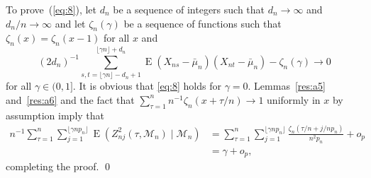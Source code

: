 \documentclass[12pt]{article}
\theoremstyle{definition}
\DeclareMathOperator{\E}{E}
\begin{document}
To prove~(\ref{eq:8}), let $d_n$ be a sequence of integers such that
$d_n \to \infty$ and $d_n/n \to \infty$ and let $\zeta_n(\gamma)$ be a
sequence of functions such that $\zeta_n(x) = \zeta_n(x - 1)$ for all
$x$ and
\begin{equation}
  (2 d_n)^{-1} \sum_{s,t = \lfloor \gamma n \rfloor - d_n +
    1}^{\lfloor \gamma n \rfloor + d_n} \E (X_{ns} -
  \bar{\mu}_n)(X_{nt} - \bar{\mu}_n) - \zeta_n(\gamma) \to 0
\end{equation}
for all $\gamma \in (0,1]$. It is obvious that \eqref{eq:8} holds for
$\gamma = 0$.  Lemmas~\ref{res:a5} and~\ref{res:a6} and the fact that
$\sum_{\tau=1}^n n^{-1} \zeta_n(x + \tau/n) \to 1$ uniformly in $x$ by
assumption imply that
\begin{align}
  n^{-1} \sum_{\tau=1}^n \sum_{j=1}^{\lfloor \gamma n p_n \rfloor}
  \E(Z_{nj}^2(\tau, \mathcal{M}_n) \mid \mathcal{M}_n) &=
  \sum_{\tau=1}^n \sum_{j=1}^{\lfloor \gamma n p_n \rfloor}
  \frac{\zeta_n(\tau/n + j/np_n)}{n^2 p_n} + o_p \\ &= \gamma + o_p,
\end{align}
completing the proof.  \qed


\end{document}
